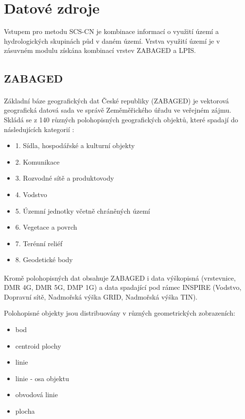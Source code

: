 \documentclass[a4paper,oneside,12pt]{book}
\begin{document}
\chapter{Datové zdroje} \label{data}
\hspace{10mm} Vstupem pro metodu SCS-CN je kombinace informací o využití území a hydrologických skupinách půd v daném území. Vrstva využití území je v zásuvném modulu získána kombinací vrstev ZABAGED a LPIS. 

\section{ZABAGED\texorpdfstring{\textsuperscript{\textregistered}}{ (R)}} \label{zabaged}

\hspace{10mm} Základní báze geografických dat České republiky (ZABAGED\texorpdfstring{\textsuperscript{\textregistered}}{ (R)}) je vektorová geografická datová sada ve správě Zeměměřického úřadu ve veřejném zájmu. Skládá se z 140 různých polohopisných geografických objektů, které spadají do následujících kategorií \cite{nEFEg7XpI9hVQCiO} :
\begin{itemize}
\item 1. Sídla, hospodářské a kulturní objekty
\item 2. Komunikace
\item 3. Rozvodné sítě a produktovody
\item 4. Vodstvo 
\item 5. Územní jednotky včetně chráněných území
\item 6. Vegetace a povrch
\item 7. Terénní reliéf
\item 8. Geodetické body
\end{itemize}
\hspace{10mm} Kromě polohopisných dat obsahuje ZABAGED\texorpdfstring{\textsuperscript{\textregistered}}{ (R)} i data výškopisná (vrstevnice, DMR 4G, DMR 5G, DMP 1G) a data spadající pod rámec INSPIRE (Vodstvo, Dopravní sítě, Nadmořská výška GRID, Nadmořská výška TIN). \cite{nEFEg7XpI9hVQCiO} 


\hspace{10mm} Polohopisné objekty jsou distribuovány v různých geometrických zobrazeních:
\begin{itemize}
\item bod
\item centroid plochy
\item linie
\item linie - osa objektu
\item obvodová linie
\item plocha
\end{itemize}
\end{document}

